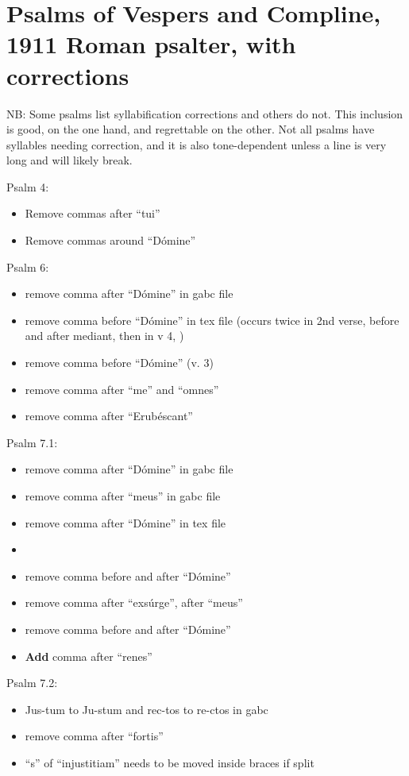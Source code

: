 \documentclass[11pt]{article}
\begin{document}
\section{Psalms of Vespers and Compline, 1911 Roman psalter, with corrections}

NB: Some psalms list syllabification corrections and others do not. This inclusion is good, on the one hand, and regrettable on the other. Not all psalms have syllables needing correction, and it is also tone-dependent unless a line is very long and will likely break.

 Psalm 4:
  \begin{itemize}
  \item   Remove commas after ``tui''
    \item Remove commas around ``Dómine''
    \end{itemize}

 Psalm 6:
  \begin{itemize}
  \item remove comma after ``Dómine'' in gabc file 
  \item  remove comma before ``Dómine'' in tex file (occurs twice in 2nd verse, before and after mediant, then in v 4, )
  \item
   remove comma before ``Dómine''  (v. 3)
   \item
   remove comma after ``me'' and ``omnes''
  \item
 remove comma after ``Erubéscant''
    \end{itemize}

 Psalm 7.1:
  \begin{itemize}
  \item remove comma after ``Dómine'' in gabc file 
  \item  remove comma after ``meus'' in gabc file 
  \item  remove comma after ``Dómine'' in tex file  \item
\item   remove comma before and after ``Dómine''
   \item
   remove comma after ``exsúrge'',  after ``meus'' 
   \item   remove comma before and after ``Dómine''
   \item
   \textbf{Add} comma after ``renes''
    \end{itemize}

 Psalm 7.2:
  \begin{itemize}
  \item Jus-tum to Ju-stum and rec-tos to re-ctos in gabc
  \item  remove comma after ``fortis''
  \item
  ``s'' of ``injustitiam'' needs to be moved inside braces if split
    \end{itemize}
\end{document}
